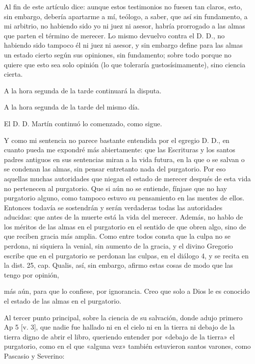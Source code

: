 Al fin de este artículo dice: aunque estos testimonios no fuesen tan claros, esto, sin embargo, debería apartarme a mí, teólogo, a saber, que así sin fundamento, a mi arbitrio, no habiendo sido yo ni juez ni asesor, habría prorrogado a las almas que parten el término de merecer. Lo mismo devuelvo contra el D. D., no habiendo sido tampoco él ni juez ni asesor, y sin embargo define para las almas un estado cierto según sus opiniones, sin fundamento; sobre todo porque no quiere que esto sea solo opinión (lo que toleraría gustosísimamente), sino ciencia cierta.

A la hora segunda de la tarde continuará la disputa.

A la hora segunda de la tarde del mismo día.

El D. D. Martín continuó lo comenzado, como sigue.

Y como mi sentencia no parece bastante entendida por el egregio D. D., en cuanto pueda me expondré más abiertamente: que las Escrituras y los santos padres antiguos en sus sentencias miran a la vida futura, en la que o se salvan o se condenan las almas, sin pensar entretanto nada del purgatorio. Por eso aquellas muchas autoridades que niegan el estado de merecer después de esta vida no pertenecen al purgatorio. Que si aún no se entiende, fínjase que no hay purgatorio alguno, como tampoco estuvo su pensamiento en las mentes de ellos. Entonces todavía se sostendrán y serán verdaderas todas las autoridades aducidas: que antes de la muerte está la vida del merecer. Además, no hablo de los méritos de las almas en el purgatorio en el sentido de que obren algo, sino de que reciben gracia más amplia. Como entre todos consta \marginpar{\small[333]} que la culpa no se perdona, ni siquiera la venial, sin aumento de la gracia, y el divino Gregorio escribe que en el purgatorio se perdonan las culpas, en el diálogo 4, y se recita en la dist. 25, cap. Qualis, así, sin embargo, afirmo estas cosas de modo que las tengo por opinión,

más aún, para que lo confiese, por ignorancia. Creo que solo a Dios le es conocido el estado de las almas en el purgatorio.

Al tercer punto principal, sobre la ciencia de su salvación, donde adujo primero Ap 5 [v. 3], que nadie fue hallado ni en el cielo ni en la tierra ni debajo de la tierra digno de abrir el libro, queriendo entender por «debajo de la tierra» el purgatorio, como en el que «alguna vez» también estuvieron santos varones, como Pascasio y Severino:

